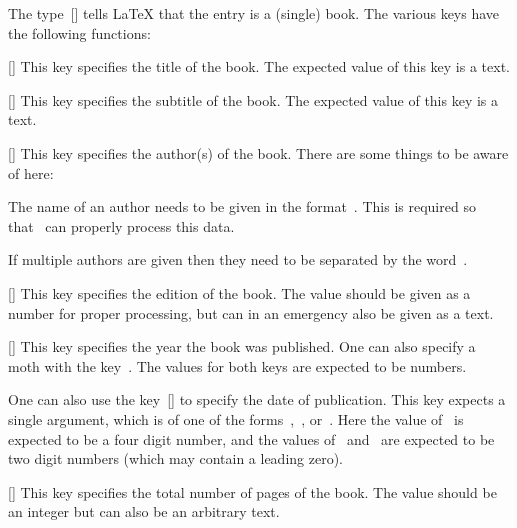 The type~[\atname] tells {\LaTeX} that the entry is a (single) book.
The various keys have the following functions:
\begin{mydescription}
  \item[\optname{title}]
    [\optname]
    This key specifies the title of the book.
    The expected value of this key is a text.
  \item[\optname{subtitle}]
    [\optname]
    This key specifies the subtitle of the book.
    The expected value of this key is a text.
  \item[\optname{author}]
    [\optname]
    This key specifies the author(s) of the book.
    There are some things to be aware of here:
    \begin{myitemize}
      \item
        The name of an author needs to be given in the format~.
        This is required so that~ can properly process this data.
      \item
        If multiple authors are given then they need to be separated by the word~.
    \end{myitemize}
  \item[\optname{edition}]
    [\optname]
    This key specifies the edition of the book.
    The value should be given as a number for proper processing, but can in an emergency also be given as a text.
  \item[\optname{year}]
    [\optname]
    This key specifies the year the book was published.
    One can also specify a moth with the key~.
    The values for both keys are expected to be numbers.
    
    One can also use the key~[\optname] to specify the date of publication.
    This key expects a single argument, which is of one of the forms~,~, or~.
    Here the value of~ is expected to be a four digit number, and the values of~ and~ are expected to be two digit numbers (which may contain a leading zero).
  \item[\optname{pagetotal}]
    [\optname]
    This key specifies the total number of pages of the book.
    The value should be an integer but can also be an arbitrary text.


\end{mydescription}

